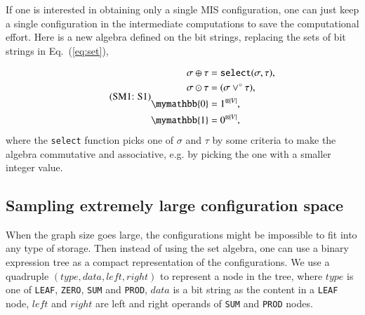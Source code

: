 \documentclass[onefignum, onetabnum]{siamart190516}
\newcommand{\eqname}[1]{\stepcounter{equation}\tag{\theequation : #1}}
\newcommand{\<}{\langle}
\renewcommand{\>}{\rangle}
\newcommand{\Eq}[1]{Eq.~(\ref{#1})}
\begin{document}
If one is interested in obtaining only a single MIS configuration, one can just keep a single configuration in the intermediate computations to save the computational effort.
Here is a new algebra defined on the bit strings, replacing the sets of bit strings in \Eq{eq:set}, 

\begin{equation}
\eqname{S1}
\begin{split}
    \sigma \oplus \tau &= \texttt{select}(\sigma, \tau), \\
    \sigma \odot \tau &= (\sigma\lor^\circ \tau),\\
    \mymathbb{0} &= 1^{\otimes |V|}, \\
    \mymathbb{1} &= 0^{\otimes |V|},
\end{split}\label{eq:singleconfig}
\end{equation}
where the \texttt{select} function picks one of $\sigma$ and $\tau$ by some criteria to make the algebra commutative and associative, e.g. by picking the one with a smaller integer value.

\subsection{Sampling extremely large configuration space}
When the graph size goes large, the configurations might be impossible to fit into any type of storage.
Then instead of using the set algebra, one can use a binary expression tree as a compact representation of the configurations.
We use a quadruple $(type, data, left, right)$ to represent a node in the tree, where $type$ is one of
\texttt{LEAF}, \texttt{ZERO}, \texttt{SUM} and \texttt{PROD}, $data$ is a bit string as the content in a \texttt{LEAF} node,
$left$ and $right$ are left and right operands of \texttt{SUM} and \texttt{PROD} nodes.
\end{document}
